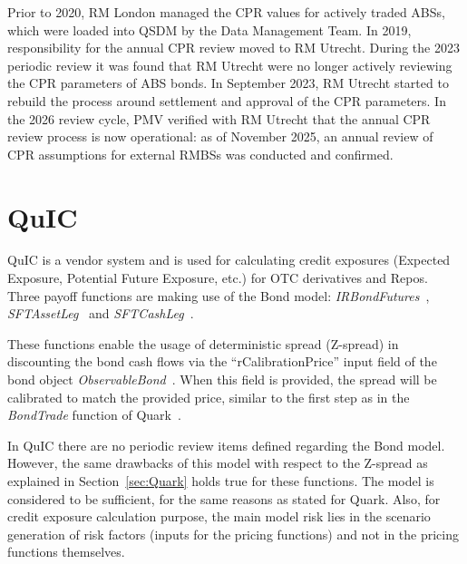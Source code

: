 \documentclass[reviewdoc]{pmv_report}  %
\begin{document}
Prior to 2020, RM London managed the CPR values for actively traded ABSs, which were loaded into QSDM by the Data Management Team. In 2019, responsibility for the annual CPR review moved to RM Utrecht.
During the 2023 periodic review it was found that RM Utrecht were no longer actively reviewing the CPR parameters of ABS bonds. In September 2023, RM Utrecht started to rebuild the process around settlement and approval of the CPR parameters.
In the 2026 review cycle, PMV verified with RM Utrecht that the annual CPR review process is now operational: as of November 2025, an annual review of CPR assumptions for external RMBSs was conducted and confirmed.

\section{QuIC}\label{sec:QuIC}
QuIC is a vendor system and is used for calculating credit exposures (Expected Exposure, Potential Future Exposure, etc.) for OTC derivatives and Repos.
Three payoff functions are making use of the Bond model: \textit{IRBondFutures}~\cite{Quic.IRBondFutures}, \textit{SFTAssetLeg}~\cite{Quic.SFTAssetLeg} and \textit{SFTCashLeg}~\cite{Quic.SFTCashLeg}.

These functions enable the usage of deterministic spread (Z-spread) in discounting the bond cash flows via the ``rCalibrationPrice'' input field of the bond object \textit{ObservableBond}~\cite{Quic.ObservableBond}. When this field is provided, the spread will be calibrated to match the provided price, similar to the first step as in the \textit{BondTrade} function of Quark~\cite{Quark.BondLibrary}.

In QuIC there are no periodic review items defined regarding the Bond model.
However, the same drawbacks of this model with respect to the Z-spread as explained in Section~\ref{sec:Quark} holds true for these functions.
The model is considered to be sufficient, for the same reasons as stated for Quark. Also, for credit exposure calculation purpose, the main model risk lies in the scenario generation of risk factors (inputs for the pricing functions) and not in the pricing functions themselves.
\end{document}
